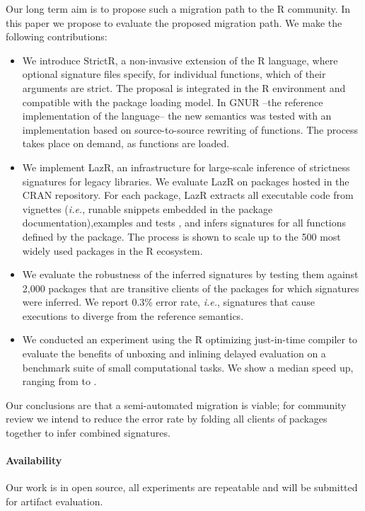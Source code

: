 \documentclass[review,nonacm,screen,acmsmall,anonymous=true]{acmart}
\newcommand{\authorcomment}[3]{}
\newcommand{\SK}[1]{\authorcomment{yellow}{SK}{#1}}
\newcommand{\OF}[1]{\authorcomment{magenta}{OF}{#1}}
\newcommand{\strictr}{{\sf StrictR}\xspace}
\newcommand{\lazr}{{\sf LazR}\xspace}
\renewcommand{\Rsh}{{\sf\u R}\xspace}
\newcommand{\ie}{\emph{i.e.},\xspace}
\begin{document}
Our long term aim is to propose such a migration path to the R community. In
this paper we propose to evaluate \SK{can we change this to 'we evaluate'?}  
the proposed migration path. We make the following contributions:

\begin{itemize}
\item We introduce \strictr, a non-invasive extension of the R language, where
  optional signature files specify, for individual functions, which of their
  arguments are strict. The proposal is integrated in the R environment and
  compatible with the package loading model. In GNUR –the reference
  implementation of the language– the new semantics was tested with an
  implementation based on source-to-source rewriting of functions. The process 
  takes place on demand, as functions are loaded.
\item We implement \lazr, an infrastructure for large-scale inference of
  strictness signatures for legacy libraries. We evaluate \lazr on packages
  hosted in the CRAN repository. For each package, \lazr extracts all executable
  code from vignettes (\ie runable snippets embedded in the package
  documentation),examples and tests 
  \SK{should 'examples and tests' be inside previous parens? I feel the sentence 
  is too long, too many commas and 'and's} , and infers signatures for all
  functions defined by the package. The process is shown to scale up to the 500
  most widely used packages in the R ecosystem.
\item We evaluate the robustness of the inferred signatures by testing them against
  2,000 packages that are transitive clients of the packages for which
  signatures were inferred. We report 0.3\% error rate, \ie signatures
  that cause executions to diverge from the reference semantics.
\item We conducted an experiment using the \Rsh optimizing just-in-time compiler
  to evaluate the benefits of unboxing and inlining
  delayed evaluation on a benchmark suite of small computational tasks. We show
  a median \speedupRshStrict speed up, ranging from \speedupRshStrictMin to \speedupRshStrictMax.
\end{itemize}

Our conclusions are that a semi-automated migration is viable; for community
review we intend to reduce the error rate by folding all clients of packages
together to infer combined signatures\OF{unclear what you mean by combined}.

\paragraph{Availability} Our work is in open source, all experiments are
repeatable and will be submitted for artifact evaluation.
\end{document}
